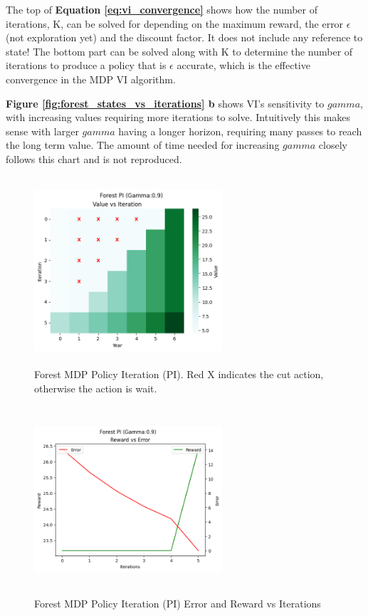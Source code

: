 \documentclass[letterpaper]{article} %
\begin{document}
 The top of \textbf{Equation \ref{eq:vi_convergence}} shows how the number of iterations, K, can be solved for depending on the maximum reward, the error $\epsilon$ (not exploration yet) and the discount factor. It does not include any reference to state!  The bottom part can be solved along with K to determine the number of iterations to produce a policy that is $\epsilon$ accurate, which is the effective convergence in the MDP VI algorithm.  
 
\textbf{Figure \ref{fig:forest_states_vs_iterations} b} shows VI's sensitivity to $gamma$, with increasing values requiring more iterations to solve.  Intuitively this makes sense with larger $gamma$ having a longer horizon, requiring many passes to reach the long term value.  The amount of time needed for increasing $gamma$ closely follows this chart and is not reproduced. 


\begin{figure}[!htb]
\centering
\includegraphics[width=2.75in, height=2.75in]{Figures/Forest_PI_Gamma_0_9_Value_vs_Iteration.png}
\caption{Forest MDP Policy Iteration (PI). Red X indicates the cut action, otherwise the action is wait. }
\label{fig:forest_pi}
\end{figure}

\begin{figure}[!htb]
\centering
\includegraphics[width=2.75in, height=2.75in]{Figures/Forest_PI_Gamma_0_9_Reward_vs_Error.png}
\caption{Forest MDP Policy Iteration (PI) Error and Reward vs Iterations}
\label{fig:forest_pi_reward_error}
\end{figure}
\end{document}
